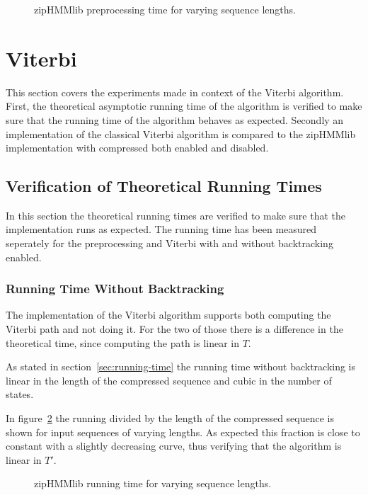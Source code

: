 \begin{figure}
  \centering
  
  \caption{zipHMMlib preprocessing time for varying sequence lengths.}
  \label{fig:pre_viterbi_n}
\end{figure}

\section{Viterbi}

This section covers the experiments made in context of the Viterbi
algorithm. First, the theoretical asymptotic running time of the algorithm is
verified to make sure that the running time of the algorithm behaves as
expected. Secondly an implementation of the classical Viterbi algorithm is
compared to the zipHMMlib implementation with compressed both enabled and
disabled.

\subsection{Verification of Theoretical Running Times}
\label{sec:theor-runn-times}

In this section the theoretical running times are verified to make sure that
the implementation runs as expected. The running time has been measured
seperately for the preprocessing and Viterbi with and without backtracking
enabled.

\subsubsection{Running Time Without Backtracking}

The implementation of the Viterbi algorithm supports both computing the Viterbi
path and not doing it. For the two of those there is a difference in the
theoretical time, since computing the path is linear in $T$.

As stated in section~\ref{sec:running-time} the running time without
backtracking is linear in the length of the compressed sequence and cubic in
the number of states.

In figure~\ref{fig:assymptotic_viterbi_n} the running divided by the length of
the compressed sequence is shown for input sequences of varying lengths. As
expected this fraction is close to constant with a slightly decreasing curve,
thus verifying that the algorithm is linear in $T'$.

\begin{figure}
  \centering
  
  \caption{zipHMMlib running time for varying sequence lengths.}
  \label{fig:assymptotic_viterbi_n}
\end{figure}

